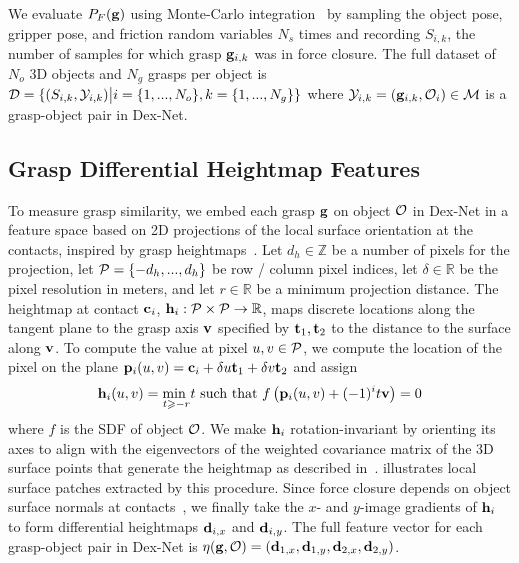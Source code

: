 We evaluate $P_F(\mathbf{g})$ using Monte-Carlo integration~\cite{kehoe2012toward} by sampling the object pose, gripper pose, and friction random variables $N_s$ times and recording $S_{i,k}$, the number of samples for which grasp $\mathbf{g}_{i,k}$ was in force closure.
The full dataset of $N_o$ 3D objects and $N_g$ grasps per object is $\mathcal{D} = \{ (S_{i, k}, \mathcal{Y}_{i, k}) \big| i = \{1, ..., N_o\}, k = \{1, ..., N_g\} \}$ where $\mathcal{Y}_{i,k} = (\mathbf{g}_{i, k}, \mathcal{O}_i) \in \mathcal{M}$ is a grasp-object pair in Dex-Net.



\subsection{Grasp Differential Heightmap Features}
To measure grasp similarity, we embed each grasp $\mathbf{g}$ on object $\mathcal{O}$ in Dex-Net in a feature space based on 2D projections of the local surface orientation at the contacts, inspired by grasp heightmaps~\cite{herzog2014learning, kappler2015leveraging}.
Let $d_h \in \mathbb{Z}$ be a number of pixels for the projection, let $\mathcal{P} = \{-d_h, ..., d_h\}$ be row / column pixel indices, let $\delta \in \mathbb{R}$ be the pixel resolution in meters, and let $r \in \mathbb{R}$ be a minimum projection distance.
The heightmap at contact $\mathbf{c}_i$, $\mathbf{h}_{i}: \mathcal{P} \times \mathcal{P} \rightarrow \mathbb{R}$, maps discrete locations along the tangent plane to the grasp axis $\mathbf{v}$ specified by $\mathbf{t}_1, \mathbf{t}_2$ to the distance to the surface along $\mathbf{v}$.
To compute the value at pixel $u,v \in \mathcal{P}$, we compute the location of the pixel on the plane $\mathbf{p}_i(u,v) = \mathbf{c}_i + \delta u \mathbf{t}_1 + \delta v \mathbf{t}_2$ and assign
\begin{align*}
	\mathbf{h}_i(u,v) = \underset{t \geqslant -r}{\text{min }} t \text{ such that } f\left( \mathbf{p}_i(u,v) + (-1)^{i} t \mathbf{v} \right) = 0
\end{align*}
\noindent where $f$ is the SDF of object $\mathcal{O}$. 
We make $\mathbf{h}_i$ rotation-invariant by orienting its axes to align with the eigenvectors of the weighted covariance matrix of the 3D surface points that generate the heightmap as described in~\cite{salti2014shot}.
 illustrates local surface patches extracted by this procedure.
Since force closure depends on object surface normals at contacts~\cite{pokorny2013c}, we finally take the $x$- and $y$-image gradients of $\mathbf{h}_i$ to form differential heightmaps $\mathbf{d}_{i,x}$ and $\mathbf{d}_{i,y}$.
The full feature vector for each grasp-object pair  in Dex-Net is $\eta(\mathbf{g}, \mathcal{O}) = (\mathbf{d}_{1,x}, \mathbf{d}_{1,y}, \mathbf{d}_{2,x}, \mathbf{d}_{2,y})$.

